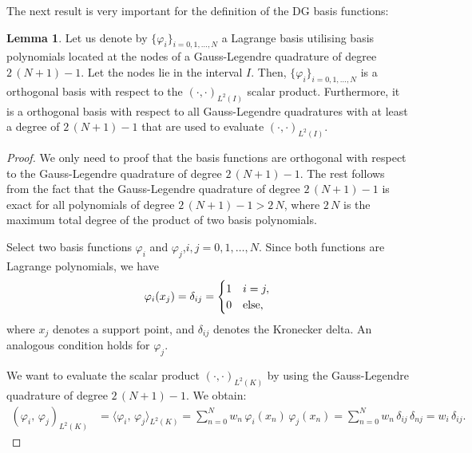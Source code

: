 \documentclass{scrreprt}
\theoremstyle{definition}
\newtheorem{lemma}[theorem]{Lemma}
\theoremstyle{nonumberplain}
\newtheorem{proof}{Proof}
\begin{document}
The next result is very important for the definition of the DG basis
functions:
\begin{lemma}
Let us denote by $\{\varphi_{i}\}_{i=0,1,\ldots,N}$ a Lagrange basis utilising
basis polynomials located at the nodes of a Gauss-Legendre quadrature of
degree $2\,(N+1)-1$. Let the nodes lie in the interval $I$.
Then, $\{\varphi_{i}\}_{i=0,1,\ldots,N}$ is a orthogonal
basis with respect to the $(\cdot,\cdot)_{L^2(I)}$ scalar product.
Furthermore, it is a orthogonal basis with respect to all
Gauss-Legendre quadratures with at least a degree
of $2\,(N+1)-1$ that are used to evaluate $(\cdot,\cdot)_{L^2(I)}$.
\end{lemma}
\begin{proof}
We only need to proof that the basis functions are orthogonal with
respect to the Gauss-Legendre quadrature of degree $2\,(N+1)-1$.
The rest follows from the fact that the Gauss-Legendre
quadrature of degree ${2\,(N+1)-1}$ is exact for all polynomials of degree
$2\,(N+1)-1 > 2\,N$, where $2\,N$ is the maximum total degree
of the product of two basis polynomials.

Select two basis functions $\varphi_{i}$ and
$\varphi_{j}$,$i,j=0,1,\ldots,N$.
Since both functions are Lagrange polynomials, we have
\begin{align}
\label{eq:preliminaries:lagrange_orthogonality}
\varphi_i (x_j) =
\delta_{ij} =
\begin{cases}
1 & i=j, \\
0 & \textup{else},
\end{cases}
\end{align}
where $x_j$ denotes a support point, and $\delta_{ij}$ denotes the
Kronecker delta.
An analogous condition holds for $\varphi_j$.

We want to evaluate the scalar product
$(\cdot,\cdot)_{L^2(K)}$ by using the Gauss-Legendre
quadrature of degree $2\,(N+1)-1$.
We obtain:
\begin{align*}
(\varphi_i,\,\varphi_j)_{L^2(K)}
&=
\langle\varphi_i,\,\varphi_j\rangle_{L^2(K)}
=
\sum_{n=0}^{N} w_n\,\varphi_{i}(x_n)\,\varphi_{j}(x_n) =
\sum_{n=0}^{N} w_n\,\delta_{ij}\,\delta_{nj} =
w_i\,\delta_{ij}.
\end{align*}
\end{proof}
\end{document}
